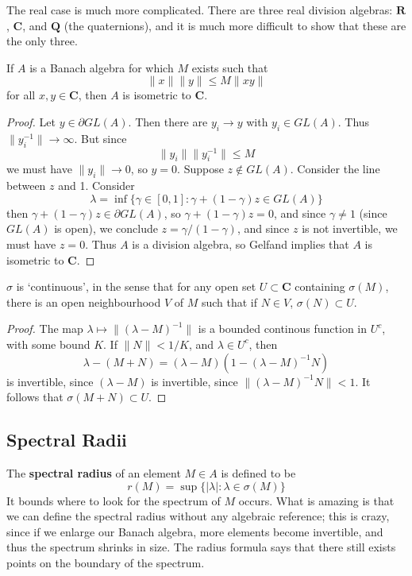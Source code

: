 The real case is much more complicated. There are three real division algebras: $\mathbf{R}$, $\mathbf{C}$, and $\mathbf{Q}$ (the quaternions), and it is much more difficult to show that these are the only three.

\begin{theorem}
    If $A$ is a Banach algebra for which $M$ exists such that
    \[ \| x \| \| y \| \leq M \| x y \| \]
    for all $x,y \in \mathbf{C}$, then $A$ is isometric to $\mathbf{C}$.
\end{theorem}
\begin{proof}
    Let $y \in \partial GL(A)$. Then there are $y_i \to y$ with $y_i \in GL(A)$. Thus $\| y_i^{-1} \| \to \infty$. But since
    \[ \| y_i \| \| y_i^{-1} \| \leq M \]
    we must have $\| y_i \| \to 0$, so $y = 0$. Suppose $z \not \in GL(A)$. Consider the line between $z$ and 1. Consider
    \[ \lambda = \inf \{ \gamma \in [0,1] : \gamma + (1 - \gamma) z \in GL(A) \} \]
    then $\gamma + (1 - \gamma) z \in \partial GL(A)$, so $\gamma + (1 - \gamma) z = 0$, and since $\gamma \neq 1$ (since $GL(A)$ is open), we conclude $z = \gamma/(1-\gamma)$, and since $z$ is not invertible, we must have $z = 0$. Thus $A$ is a division algebra, so Gelfand implies that $A$ is isometric to $\mathbf{C}$.
\end{proof}

\begin{theorem}
    $\sigma$ is `continuous', in the sense that for any open set $U \subset \mathbf{C}$ containing $\sigma(M)$, there is an open neighbourhood $V$ of $M$ such that if $N \in V$, $\sigma(N) \subset U$.
\end{theorem}
\begin{proof}
    The map $\lambda \mapsto \| (\lambda - M)^{-1} \|$ is a bounded continous function in $U^c$, with some bound $K$. If $\| N \| < 1/K$, and $\lambda \in U^c$, then
    \[ \lambda - (M + N) = (\lambda - M)(1 - (\lambda - M)^{-1}N) \]
    is invertible, since $(\lambda - M)$ is invertible, since $\| (\lambda - M)^{-1} N \| < 1$. It follows that $\sigma(M + N) \subset U$.
\end{proof}

\subsection{Spectral Radii}

The {\bf spectral radius} of an element $M \in A$ is defined to be
%
\[ r(M) = \sup \{ |\lambda| : \lambda \in \sigma(M) \} \]
%
It bounds where to look for the spectrum of $M$ occurs. What is amazing is that we can define the spectral radius without any algebraic reference; this is crazy, since if we enlarge our Banach algebra, more elements become invertible, and thus the spectrum shrinks in size. The radius formula says that there still exists points on the boundary of the spectrum.

